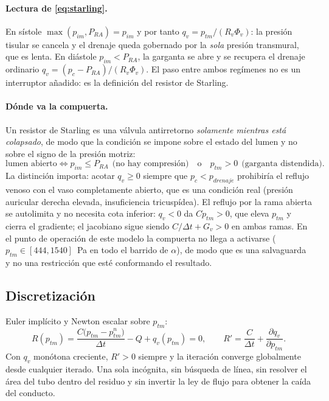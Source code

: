 \documentclass[11pt]{article}
\newcommand{\dd}[2]{\frac{\partial #1}{\partial #2}}
\begin{document}
\paragraph{Lectura de \eqref{eq:starling}.} En s\'istole $\max(p_{im},P_{RA})=
p_{im}$ y por tanto $q_v=p_{tm}/(R_v\Phi_v)$: la presi\'on tisular se cancela y
el drenaje queda gobernado por la \emph{sola} presi\'on transmural, que es lenta.
En di\'astole $p_{im}<P_{RA}$, la garganta se abre y se recupera el drenaje
ordinario $q_v=(p_c-P_{RA})/(R_v\Phi_v)$. El paso entre ambos reg\'imenes no es
un interruptor a\~nadido: es la definici\'on del resistor de Starling.

\paragraph{D\'onde va la compuerta.} Un resistor de Starling es una v\'alvula
antirretorno \emph{solamente mientras est\'a colapsado}, de modo que la
condici\'on se impone sobre el estado del lumen y no sobre el signo de la
presi\'on motriz:
\begin{equation}
  \text{lumen abierto}
  \iff
  p_{im}\le P_{RA}
  \ \ \text{(no hay compresi\'on)}
  \quad\text{o}\quad
  p_{tm}>0
  \ \ \text{(garganta distendida)} .
  \label{eq:gate}
\end{equation}
La distinci\'on importa: acotar $q_v\ge0$ siempre que $p_c<p_{drenaje}$
prohibir\'ia el reflujo venoso con el vaso completamente abierto, que es una
condici\'on real (presi\'on auricular derecha elevada, insuficiencia
tricusp\'idea). El reflujo por la rama abierta se autolimita y no necesita cota
inferior: $q_v<0$ da $C\dot p_{tm}>0$, que eleva $p_{tm}$ y cierra el
gradiente; el jacobiano sigue siendo $C/\Delta t+G_v>0$ en ambas ramas. En el
punto de operaci\'on de este modelo la compuerta no llega a activarse
($p_{tm}\in[444,1540]$~Pa en todo el barrido de $\alpha$), de modo que es una
salvaguarda y no una restricci\'on que est\'e conformando el resultado.

\subsection{Discretizaci\'on}

Euler impl\'icito y Newton escalar sobre $p_{tm}$:
\begin{equation}
  R(p_{tm})=\frac{C\bigl(p_{tm}-p_{tm}^{n}\bigr)}{\Delta t}-Q+q_v(p_{tm})=0,
  \qquad
  R'=\frac{C}{\Delta t}+\dd{q_v}{p_{tm}} .
  \label{eq:newton}
\end{equation}
Con $q_v$ mon\'otona creciente, $R'>0$ siempre y la iteraci\'on converge
globalmente desde cualquier iterado. Una sola inc\'ognita, sin b\'usqueda de
l\'inea, sin resolver el \'area del tubo dentro del residuo y sin invertir la
ley de flujo para obtener la ca\'ida del conducto.
\end{document}
